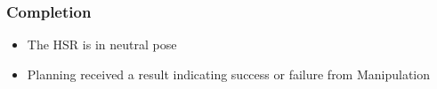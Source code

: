\documentclass[main.tex]{subfiles}
\begin{document}
	\subsubsection{Completion}
	\begin{itemize}
		\item The HSR is in neutral pose
		\item Planning received a result indicating success or failure from Manipulation				
	\end{itemize}
	
\end{document}
